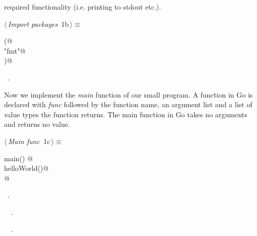 \documentclass[a4paper]{report}
\begin{document}
required functionality (i.e. printing to stdout etc.).
\begin{flushleft} \small
\begin{minipage}{\linewidth}\label{scrap2}\raggedright\small
{} $\langle\,${\itshape Import packages}\nobreak\ {\footnotesize {1b}}$\,\rangle\equiv$
\vspace{-1ex}
\begin{list}{}{} \item
\mbox{}\lstinline@import (@\\
\mbox{}\lstinline@  "fmt"@\\
\mbox{}\lstinline@)@\\
\mbox{}\lstinline@@{\NWsep}
\end{list}
\vspace{-1.5ex}
\footnotesize
\begin{list}{}{\setlength{\itemsep}{-\parsep}\setlength{\itemindent}{-\leftmargin}}
\item \NWtxtMacroRefIn\ .

\item{}
\end{list}
\end{minipage}\vspace{4ex}
\end{flushleft}

Now we implement the \emph{main} function of our small program. A function in
Go is declared with \emph{func} followed by the function name, an argument
list and a list of value types the function returns. The main function in Go
takes no arguments and returns no value.
\begin{flushleft} \small
\begin{minipage}{\linewidth}\label{scrap3}\raggedright\small
{} $\langle\,${\itshape Main func}\nobreak\ {\footnotesize {1c}}$\,\rangle\equiv$
\vspace{-1ex}
\begin{list}{}{} \item
\mbox{}\lstinline@func main() {@\\
\mbox{}\lstinline@  helloWorld()@\\
\mbox{}\lstinline@}@\\
\mbox{}\lstinline@@{\NWsep}
\end{list}
\vspace{-1.5ex}
\footnotesize
\begin{list}{}{\setlength{\itemsep}{-\parsep}\setlength{\itemindent}{-\leftmargin}}
\item \NWtxtMacroRefIn\ .
\item \NWtxtIdentsDefed\nobreak\  \verb@main@\nobreak\ .\item \NWtxtIdentsUsed\nobreak\  \verb@helloWorld@\nobreak\ .
\item{}
\end{list}
\end{minipage}\vspace{4ex}
\end{flushleft}
\end{document}
